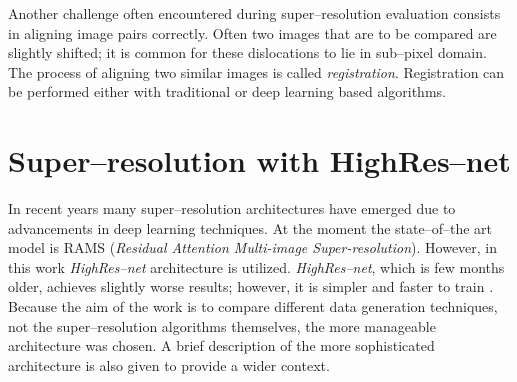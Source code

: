 Another challenge often encountered during super--resolution evaluation consists in aligning image pairs correctly.
Often two images that are to be compared are slightly shifted; it is common for these dislocations to lie in sub--pixel domain.
The process of aligning two similar images is called \textit{registration}.
Registration can be performed either with traditional or deep learning based algorithms.

\section{Super--resolution with HighRes--net}
In recent years many super--resolution architectures have emerged due to advancements in deep learning techniques.
At the moment the state--of--the art model is RAMS (\textit{Residual Attention Multi-image Super-resolution}).
However, in this work \textit{HighRes--net} architecture is utilized.
\textit{HighRes--net}, which is few months older, achieves slightly worse results; however, it is simpler and faster to train \cite{paperswithcode-ranking}.
Because the aim of the work is to compare different data generation techniques, not the super--resolution algorithms themselves, the more manageable architecture was chosen.
A brief description of the more sophisticated architecture is also given to provide a wider context.

